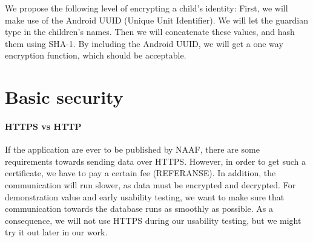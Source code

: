 We propose the following level of encrypting a child's identity:
First, we will make use of the Android UUID (Unique Unit Identifier). We will let the guardian type in the children's names. Then we will concatenate these values, and hash them using SHA-1. By including the Android UUID, we will get a one way encryption function, which should be acceptable.
 




\section{Basic security}
\paragraph{HTTPS vs HTTP} If the application are ever to be published by NAAF, there are some requirements towards sending data over HTTPS. However, in order to get such a certificate, we have to pay a certain fee (REFERANSE). In addition, the communication will run slower, as data must be encrypted and decrypted. For demonstration value and early usability testing, we want to make sure that communication towards the database runs as smoothly as possible. As a consequence, we will not use HTTPS during our usability testing, but we might try it out later in our work.


    
